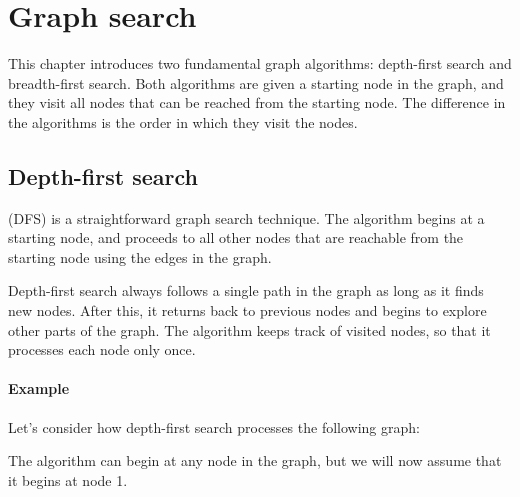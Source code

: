 \chapter{Graph search}

This chapter introduces two fundamental
graph algorithms:
depth-first search and breadth-first search.
Both algorithms are given a starting
node in the graph,
and they visit all nodes that can be reached
from the starting node.
The difference in the algorithms is the order
in which they visit the nodes.

\section{Depth-first search}


 (DFS)
is a straightforward graph search technique.
The algorithm begins at a starting node,
and proceeds to all other nodes that are
reachable from the starting node using
the edges in the graph.

Depth-first search always follows a single
path in the graph as long as it finds
new nodes.
After this, it returns back to previous
nodes and begins to explore other parts of the graph.
The algorithm keeps track of visited nodes,
so that it processes each node only once.

\subsubsection*{Example}

Let's consider how depth-first search processes
the following graph:
\begin{center}
\end{center}
The algorithm can begin at any node in the graph,
but we will now assume that it begins
at node 1.

